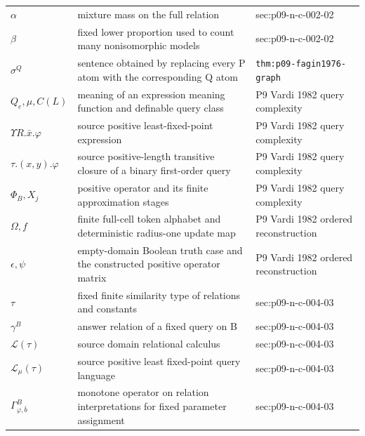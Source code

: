 \begin{longtable}{@{}p{}p{}p{}@{}}
\(\alpha\) & mixture mass on the full relation & sec:\allowbreak{}p09-\allowbreak{}n-\allowbreak{}c-\allowbreak{}002-\allowbreak{}02 \\
\(\beta\) & fixed lower proportion used to count many nonisomorphic models & sec:\allowbreak{}p09-\allowbreak{}n-\allowbreak{}c-\allowbreak{}002-\allowbreak{}02 \\
\(\sigma^Q\) & sentence obtained by replacing every P atom with the corresponding Q atom & \texttt{thm:\allowbreak{}p09-\allowbreak{}fagin1976-\allowbreak{}graph} \\
\(Q_e,\allowbreak \mu,\allowbreak C(L)\) & meaning of an expression meaning function and definable query class & P9 Vardi 1982 query complexity \\
\(\Upsilon R.\bar x.\varphi\) & source positive least-fixed-point expression & P9 Vardi 1982 query complexity \\
\(\tau.(x,\allowbreak y).\varphi\) & source positive-length transitive closure of a binary first-order query & P9 Vardi 1982 query complexity \\
\(\Phi_B,\allowbreak X_j\) & positive operator and its finite approximation stages & P9 Vardi 1982 query complexity \\
\(\Omega,\allowbreak f\) & finite full-cell token alphabet and deterministic radius-one update map & P9 Vardi 1982 ordered reconstruction \\
\(\epsilon,\allowbreak \psi\) & empty-domain Boolean truth case and the constructed positive operator matrix & P9 Vardi 1982 ordered reconstruction \\
\(\tau\) & fixed finite similarity type of relations and constants & sec:\allowbreak{}p09-\allowbreak{}n-\allowbreak{}c-\allowbreak{}004-\allowbreak{}03 \\
\(\gamma^B\) & answer relation of a fixed query on B & sec:\allowbreak{}p09-\allowbreak{}n-\allowbreak{}c-\allowbreak{}004-\allowbreak{}03 \\
\(\mathcal L(\tau)\) & source domain relational calculus & sec:\allowbreak{}p09-\allowbreak{}n-\allowbreak{}c-\allowbreak{}004-\allowbreak{}03 \\
\(\mathcal L_\mu(\tau)\) & source positive least fixed-point query language & sec:\allowbreak{}p09-\allowbreak{}n-\allowbreak{}c-\allowbreak{}004-\allowbreak{}03 \\
\(\Gamma_{\varphi,\bar b}^B\) & monotone operator on relation interpretations for fixed parameter assignment & sec:\allowbreak{}p09-\allowbreak{}n-\allowbreak{}c-\allowbreak{}004-\allowbreak{}03 \\

\end{longtable}
